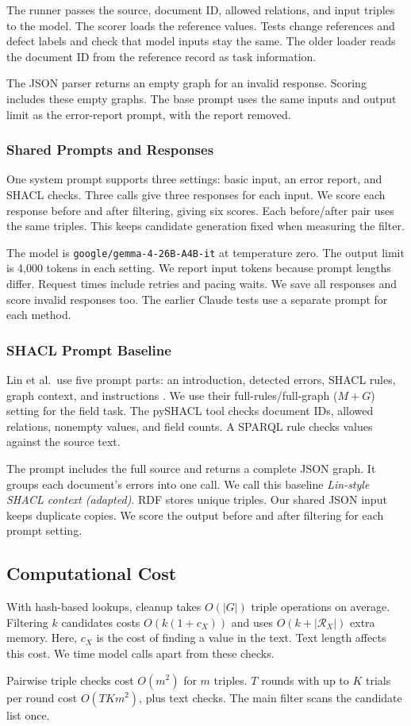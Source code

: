 The runner passes the source, document ID, allowed relations, and input triples
to the model.
The scorer loads the reference values.
Tests change references and defect labels and check that model inputs stay the same.
The older loader reads the document ID from the reference record as task information.

The JSON parser returns an empty graph for an invalid response.
Scoring includes these empty graphs.
The base prompt uses the same inputs and output limit as the error-report
prompt, with the report removed.

\subsubsection{Shared Prompts and Responses}

One system prompt supports three settings: basic input, an error report,
and SHACL checks.
Three calls give three responses for each input.
We score each response before and after filtering, giving six scores.
Each before/after pair uses the same triples.
This keeps candidate generation fixed when measuring the filter.

The model is \texttt{google/gemma-4-26B-A4B-it} at temperature zero.
The output limit is 4,000 tokens in each setting.
We report input tokens because prompt lengths differ.
Request times include retries and pacing waits.
We save all responses and score invalid responses too.
The earlier Claude tests use a separate prompt for each method.

\subsubsection{SHACL Prompt Baseline}
\label{sec:impl:shacl}

Lin et al.\ use five prompt parts: an introduction, detected errors,
SHACL rules, graph context, and instructions \citep{ref_lin2025}.
We use their full-rules/full-graph ($M+G$) setting for the field task.
The pySHACL tool checks document IDs, allowed relations, nonempty values,
and field counts.
A SPARQL rule checks values against the source text.

The prompt includes the full source and returns a complete JSON graph.
It groups each document's errors into one call.
We call this baseline \emph{Lin-style SHACL context (adapted)}.
RDF stores unique triples.
Our shared JSON input keeps duplicate copies.
We score the output before and after filtering for each prompt setting.

\subsection{Computational Cost}

With hash-based lookups, cleanup takes $O(|G|)$ triple operations on average.
Filtering $k$ candidates costs $O(k(1+c_X))$ and uses
$O(k+|\mathcal R_X|)$ extra memory.
Here, $c_X$ is the cost of finding a value in the text.
Text length affects this cost.
We time model calls apart from these checks.

Pairwise triple checks cost $O(m^2)$ for $m$ triples.
$T$ rounds with up to $K$ trials per round cost $O(TKm^2)$, plus text checks.
The main filter scans the candidate list once.
